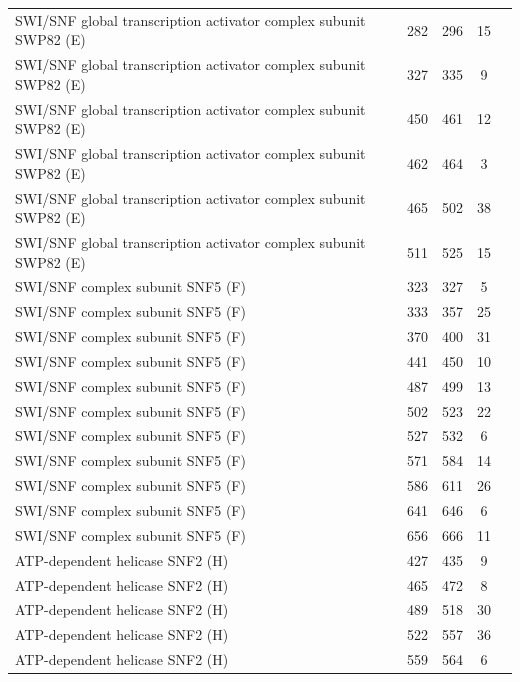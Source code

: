 \begin{longtable}{@{}p{7.5cm}rrrl@{}}
  SWI/SNF global transcription activator complex subunit SWP82 (E) & 282 & 296 & \multicolumn{1}{c}{15} \\
  SWI/SNF global transcription activator complex subunit SWP82 (E) & 327 & 335 & \multicolumn{1}{c}{9} \\
  SWI/SNF global transcription activator complex subunit SWP82 (E) & 450 & 461 & \multicolumn{1}{c}{12} \\
  SWI/SNF global transcription activator complex subunit SWP82 (E) & 462 & 464 & \multicolumn{1}{c}{3} \\
  SWI/SNF global transcription activator complex subunit SWP82 (E) & 465 & 502 & \multicolumn{1}{c}{38} \\
  SWI/SNF global transcription activator complex subunit SWP82 (E) & 511 & 525 & \multicolumn{1}{c}{15} \\
  SWI/SNF complex subunit SNF5 (F) & 323 & 327 & \multicolumn{1}{c}{5} \\
  SWI/SNF complex subunit SNF5 (F) & 333 & 357 & \multicolumn{1}{c}{25} \\
  SWI/SNF complex subunit SNF5 (F) & 370 & 400 & \multicolumn{1}{c}{31} \\
  SWI/SNF complex subunit SNF5 (F) & 441 & 450 & \multicolumn{1}{c}{10} \\
  SWI/SNF complex subunit SNF5 (F) & 487 & 499 & \multicolumn{1}{c}{13} \\
  SWI/SNF complex subunit SNF5 (F) & 502 & 523 & \multicolumn{1}{c}{22} \\
  SWI/SNF complex subunit SNF5 (F) & 527 & 532 & \multicolumn{1}{c}{6} \\
  SWI/SNF complex subunit SNF5 (F) & 571 & 584 & \multicolumn{1}{c}{14} \\
  SWI/SNF complex subunit SNF5 (F) & 586 & 611 & \multicolumn{1}{c}{26} \\
  SWI/SNF complex subunit SNF5 (F) & 641 & 646 & \multicolumn{1}{c}{6} \\
  SWI/SNF complex subunit SNF5 (F) & 656 & 666 & \multicolumn{1}{c}{11} \\
  ATP-dependent helicase SNF2 (H) & 427 & 435 & \multicolumn{1}{c}{9} \\
  ATP-dependent helicase SNF2 (H) & 465 & 472 & \multicolumn{1}{c}{8} \\
  ATP-dependent helicase SNF2 (H) & 489 & 518 & \multicolumn{1}{c}{30} \\
  ATP-dependent helicase SNF2 (H) & 522 & 557 & \multicolumn{1}{c}{36} \\
  ATP-dependent helicase SNF2 (H) & 559 & 564 & \multicolumn{1}{c}{6} \\

\end{longtable}

